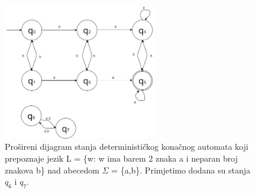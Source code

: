 \documentclass[titlepage]{article}
\begin{document}
\begin{figure}[h]
\centering
\includegraphics[width=0.6\textwidth]{Diagram2.jpg}
\caption{Prošireni dijagram stanja determinističkog konačnog automata koji prepoznaje jezik L = \{w: w ima barem 2 znaka a i neparan broj znakova b\} nad abecedom $\Sigma$ = \{a,b\}. Primjetimo dodana su stanja $q_6$ i $q_7$.
}
\end{figure}
\end{document}

